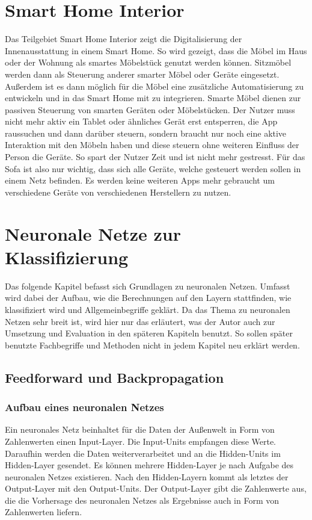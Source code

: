 \section{Smart Home Interior}
Das Teilgebiet Smart Home Interior zeigt die Digitalisierung der Innenausstattung in einem Smart Home. So wird gezeigt, dass die Möbel im Haus oder der Wohnung als smartes Möbelstück genutzt werden können. Sitzmöbel werden dann als Steuerung anderer smarter Möbel oder Geräte eingesetzt. Außerdem ist es dann möglich für die Möbel eine zusätzliche Automatisierung zu entwickeln und in das Smart Home mit zu integrieren. Smarte Möbel dienen zur passiven Steuerung von smarten Geräten oder Möbelstücken. Der Nutzer muss nicht mehr aktiv ein Tablet oder ähnliches Gerät erst entsperren, die App raussuchen und dann darüber steuern, sondern braucht nur noch eine aktive Interaktion mit den Möbeln haben und diese steuern ohne weiteren Einfluss der Person die Geräte. So spart der Nutzer Zeit und ist nicht mehr gestresst. 
\newline
Für das Sofa ist also nur wichtig, dass sich alle Geräte, welche gesteuert werden sollen in einem Netz befinden. Es werden keine weiteren Apps mehr gebraucht um verschiedene Geräte von verschiedenen Herstellern zu nutzen.

\section{Neuronale Netze zur Klassifizierung}
\label{sec:NNK}
Das folgende Kapitel befasst sich Grundlagen zu neuronalen Netzen. Umfasst wird dabei der Aufbau, wie die Berechnungen auf den Layern stattfinden, wie klassifiziert wird und Allgemeinbegriffe geklärt. Da das Thema zu neuronalen Netzen sehr breit ist, wird hier nur das erläutert, was der Autor auch zur Umsetzung und Evaluation in den späteren Kapiteln benutzt. So sollen später benutzte Fachbegriffe und Methoden nicht in jedem Kapitel neu erklärt werden.

\subsection{Feedforward und Backpropagation}
\subsubsection{Aufbau eines neuronalen Netzes}
Ein neuronales Netz beinhaltet für die Daten der Außenwelt in Form von Zahlenwerten einen Input-Layer. Die Input-Units empfangen diese Werte. Daraufhin werden die Daten weiterverarbeitet und an die Hidden-Units im Hidden-Layer gesendet. Es können mehrere Hidden-Layer je nach Aufgabe des neuronalen Netzes existieren. Nach den Hidden-Layern kommt als letztes der Output-Layer mit den Output-Units. Der Output-Layer gibt die Zahlenwerte aus, die die Vorhersage des neuronalen Netzes als Ergebnisse auch in Form von Zahlenwerten liefern.

